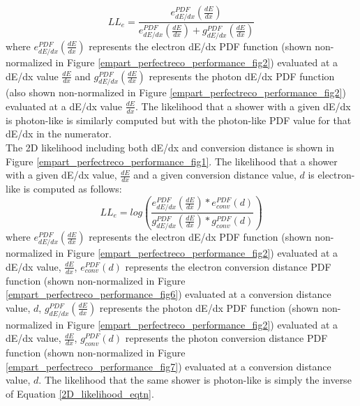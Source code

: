 \begin{equation}\label{1D_dedx_likelihood_eqtn}
LL_e=\frac{e_{dE/dx}^{PDF}(\frac{dE}{dx})}{ e_{dE/dx}^{PDF}(\frac{dE}{dx}) + g_{dE/dx}^{PDF}(\frac{dE}{dx}) }
\end{equation}
where $e_{dE/dx}^{PDF}(\frac{dE}{dx})$ represents the electron dE/dx PDF function (shown non-normalized in Figure \ref{empart_perfectreco_performance_fig2}) evaluated at a dE/dx value $\frac{dE}{dx}$ and $g_{dE/dx}^{PDF}(\frac{dE}{dx})$ represents the photon dE/dx PDF function (also shown non-normalized in Figure \ref{empart_perfectreco_performance_fig2}) evaluated at a dE/dx value $\frac{dE}{dx}$. The likelihood that a shower with a given dE/dx is photon-like is similarly computed but with the photon-like PDF value for that dE/dx in the numerator.\\

The 2D likelihood including both dE/dx and conversion distance is shown in Figure \ref{empart_perfectreco_performance_fig1}. The likelihood that a shower with a given dE/dx value, $\frac{dE}{dx}$ and a given conversion distance value, $d$ is electron-like is computed as follows: 
\begin{equation}\label{2D_likelihood_eqtn}
LL_e=log( \frac{e_{dE/dx}^{PDF}(\frac{dE}{dx}) * e_{conv}^{PDF}(d)}{g_{dE/dx}^{PDF}(\frac{dE}{dx}) * g_{conv}^{PDF}(d)} )
\end{equation}
where $e_{dE/dx}^{PDF}(\frac{dE}{dx})$ represents the electron dE/dx PDF function (shown non-normalized in Figure \ref{empart_perfectreco_performance_fig2}) evaluated at a dE/dx value, $\frac{dE}{dx}$, $e_{conv}^{PDF}(d)$ represents the electron conversion distance PDF function (shown non-normalized in Figure \ref{empart_perfectreco_performance_fig6}) evaluated at a conversion distance value, $d$, $g_{dE/dx}^{PDF}(\frac{dE}{dx})$ represents the photon dE/dx PDF function (shown non-normalized in Figure \ref{empart_perfectreco_performance_fig2}) evaluated at a dE/dx value, $\frac{dE}{dx}$, $g_{conv}^{PDF}(d)$ represents the photon conversion distance PDF function (shown non-normalized in Figure \ref{empart_perfectreco_performance_fig7}) evaluated at a conversion distance value, $d$. The likelihood that the same shower is photon-like is simply the inverse of Equation \ref{2D_likelihood_eqtn}.\\



